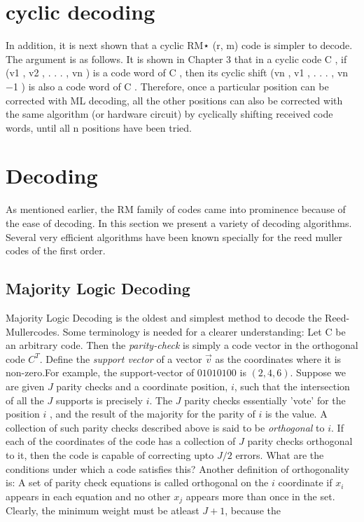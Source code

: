\documentclass{article}
\newcommand{\rem}{Reed-Muller}
\begin{document}
\section{cyclic decoding}
In addition, it is next shown that a cyclic RM⋆ (r, m) code is simpler to decode. The 
argument is as follows. It is shown in Chapter 3 that in a cyclic code C , if (v1 , v2 , . . . , vn ) 
is a code word of C , then its cyclic shift (vn , v1 , . . . , vn 
−1 ) is also a code word of C . 
Therefore, once a particular position can be corrected with ML decoding, all the other 
positions can also be corrected with the same algorithm (or hardware circuit) by cyclically 
shifting received code words, until all n positions have been tried.
\section {Decoding}
As mentioned earlier, the RM family of codes came into prominence because of the ease of decoding. In this section we present a variety of decoding algorithms. 
Several very efficient algorithms have been known specially for the reed muller codes of the first order. 
\subsection {Majority Logic Decoding}
Majority Logic Decoding is the oldest and simplest method to decode the \rem codes. 
Some terminology is needed for a clearer understanding:
Let C be an arbitrary code. Then the \emph{parity-check} is simply a code vector in the orthogonal code $C^{T}$. 
Define the \emph{support vector} of a vector $\vec{v}$ as the coordinates where it is non-zero.For example, the support-vector of $01010100$ is $(2,4,6)$.
Suppose we are given $J$ parity checks and a coordinate position, $i$, such that the intersection of all the $J$ supports is precisely $i$. The $J$ parity checks essentially 'vote' for the position $i$ , and the result of the majority for the parity of $i$ is the value. 
A collection of such parity checks described above is said to be \emph{orthogonal} to $i$. If each of the coordinates of the code has a collection of $J$ parity checks orthogonal to it, then the code is capable of correcting upto $J/2$  errors.
What are the conditions under which a code satisfies this?
Another definition of orthogonality is: A set of parity check equations is called orthogonal on the $i$ coordinate if $x_i$ appears in each equation and no other $x_j$ appears more than once in the set.
Clearly, the minimum weight must be atleast $J+1$, because the 
\end{document}
